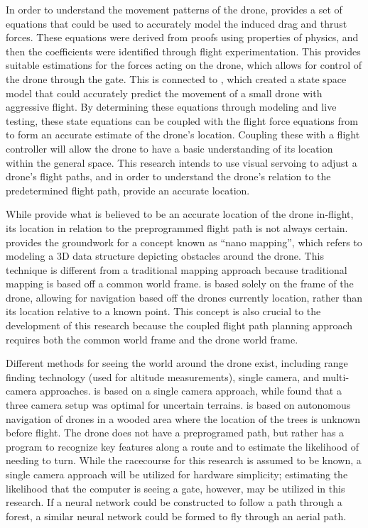 In order to understand the movement patterns of the drone, \cite{svacha2017improving} provides a set of equations that could be used to accurately model the induced drag and thrust forces. These equations were derived from proofs using properties of physics, and then the coefficients were identified through flight experimentation. This provides suitable estimations for the forces acting on the drone, which allows for control of the drone through the gate. This is connected to \cite{condliffe2016is}, which created a state space model that could accurately predict the movement of a small drone with aggressive flight. By determining these equations through modeling and live testing, these state equations can be coupled with the flight force equations from \cite{svacha2017improving} to form an accurate estimate of the drone’s location. Coupling these with a flight controller will allow the drone to have a basic understanding of its location within the general space. This research intends to use visual servoing to adjust a drone’s flight paths, and in order to understand the drone’s relation to the predetermined flight path, \cite{svacha2017improving, loianno2017estimation} provide an accurate location.
    
While \cite{svacha2017improving, loianno2017estimation} provide what is believed to be an accurate location of the drone in-flight, its location in relation to the preprogrammed flight path is not always certain. \cite{florence2018nanomap} provides the groundwork for a concept known as ``nano mapping'', which refers to modeling a 3D data structure depicting obstacles around the drone. This technique is different from a traditional mapping approach because traditional mapping is based off a common world frame. \cite{florence2018nanomap} is based solely on the frame of the drone, allowing for navigation based off the drones currently location, rather than its location relative to a known point. This concept is also crucial to the development of this research because the coupled flight path planning approach requires both the common world frame and the drone world frame.

Different methods for seeing the world around the drone exist, including range finding technology (used for altitude measurements), single camera, and multi-camera approaches. \cite{loianno2017estimation} is based on a single camera approach, while \cite{iot2018how} found that a three camera setup was optimal for uncertain terrains. \cite{zhilenkov2018use} is based on autonomous navigation of drones in a wooded area where the location of the trees is unknown before flight. The drone does not have a preprogramed path, but rather has a program to recognize key features along a route and to estimate the likelihood of needing to turn. While the racecourse for this research is assumed to be known, a single camera approach will be utilized for hardware simplicity; estimating the likelihood that the computer is seeing a gate, however, may be utilized in this research. If a neural network could be constructed to follow a path through a forest, a similar neural network could be formed to fly through an aerial path.
    
